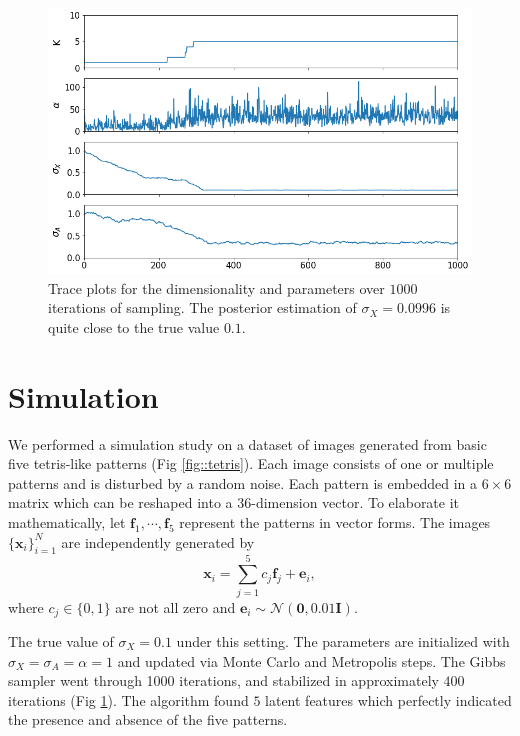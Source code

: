 \documentclass{article}
\begin{document}
\begin{figure}[!h]
  \centering
  \includegraphics[width = \textwidth]{figures/gibbsresultblock.png}
  \caption{Trace plots for the dimensionality and parameters over $1000$ iterations of sampling. The posterior estimation of $\sigma_X = 0.0996$ is quite close to the true value $0.1$.}
  \label{fig::gibbsblock}
\end{figure}

\section{Simulation}\label{sec::simulation}

We performed a simulation study on a dataset of images generated from basic five tetris-like patterns (Fig \ref{fig::tetris}). Each image consists of one or multiple patterns and is disturbed by a random noise. Each pattern is embedded in a $6\times 6$ matrix which can be reshaped into a $36$-dimension vector. To elaborate it mathematically, let $\boldsymbol{f}_1, \cdots, \boldsymbol{f}_5$ represent the patterns in vector forms. The images $\{\boldsymbol{x}_{i}\}_{i=1}^N$ are independently generated by \begin{equation}\boldsymbol{x}_i = \sum_{j=1}^5 c_j \boldsymbol{f}_j + \boldsymbol{e}_i,\end{equation} where $c_j\in\{0,1\}$ are not all zero and $\boldsymbol{e}_i\sim\mathcal{N}(\boldsymbol{0}, 0.01 \mathbf{I})$.


The true value of $\sigma_X = 0.1$ under this setting. The parameters are initialized with $\sigma_X = \sigma_A = \alpha = 1$ and updated via Monte Carlo and Metropolis steps. The Gibbs sampler went through 1000 iterations, and stabilized in approximately $400$ iterations (Fig \ref{fig::gibbsblock}). The algorithm found $5$ latent features which perfectly indicated the presence and absence of the five patterns.
\end{document}
